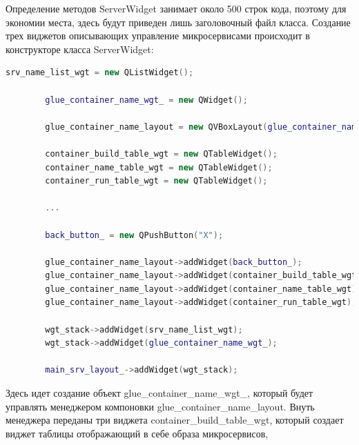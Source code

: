 \documentclass[a4paper, 14pt]{extreport}
\begin{document}



\par Определение методов ServerWidget занимает около 500 строк кода, поэтому для экономии места, здесь будут приведен лишь заголовочный 
файл класса. Создание трех виджетов описывающих управление микросервисами происходит в конструкторе класса ServerWidget:
\begin{lstlisting}[language=C++, frame=single, xleftmargin=15pt, caption={Создание виджетов ServerWidget},label=DescriptiveLabel]
        srv_name_list_wgt = new QListWidget();

        glue_container_name_wgt_ = new QWidget();

        glue_container_name_layout = new QVBoxLayout(glue_container_name_wgt_);

        container_build_table_wgt = new QTableWidget();
        container_name_table_wgt = new QTableWidget();
        container_run_table_wgt = new QTableWidget();

        ...

        back_button_ = new QPushButton("X");

        glue_container_name_layout->addWidget(back_button_);
        glue_container_name_layout->addWidget(container_build_table_wgt);
        glue_container_name_layout->addWidget(container_name_table_wgt);
        glue_container_name_layout->addWidget(container_run_table_wgt);

        wgt_stack->addWidget(srv_name_list_wgt);
        wgt_stack->addWidget(glue_container_name_wgt_);

        main_srv_layout_->addWidget(wgt_stack);
\end{lstlisting}
\par Здесь идет создание объект glue\_container\_name\_wgt\_, который будет управлять менеджером компоновки glue\_container\_name\_layout.
Внуть менеджера переданы три виджета container\_build\_table\_wgt, который создает виджет таблицы отображающий в себе образа микросервисов, 
\end{document}
